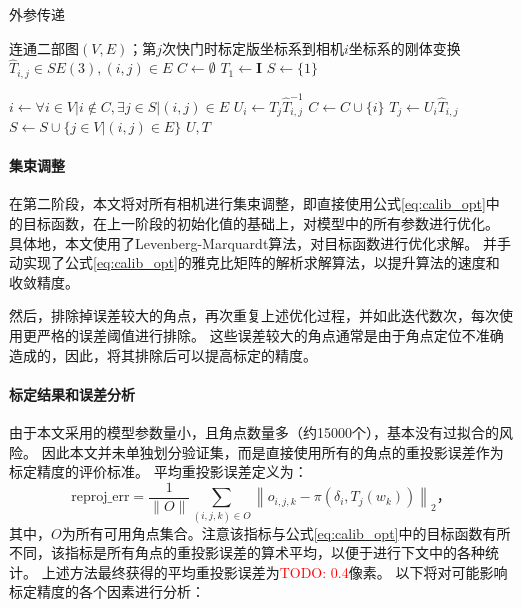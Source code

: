 \documentclass{scutmaster}
\newcommand{\TODO}[1]{\textcolor{red}{TODO: #1}}
\begin{document}
\begin{algorithm}[t]
    \caption{外参传递}
    \label{alg:calib_init}
    \begin{algorithmic}[1]
        \Require 连通二部图$(V,E)$；第$j$次快门时标定版坐标系到相机$i$坐标系的刚体变换$\hat{T}_{i,j}\in SE(3),(i,j)\in E$
            \State $C \gets \emptyset$
            \State $T_{1} \gets \mathbf{I}$
            \State $S \gets \{1\}$

                \State $i \gets \forall i\in V| i\notin C, \exists j\in S| (i,j)\in E$
                \State $U_{i} \gets T_{j}\hat{T}_{i,j}^{-1}$
                \State $C \gets C \cup \{i\}$
                    \State $T_{j} \gets U_{i}\hat{T}_{i,j}$
                \EndFor
                \State $S \gets S \cup \{j\in V| (i,j)\in E\}$
            \EndWhile
            \State \Return $U, T$
        \EndProcedure
    \end{algorithmic}
\end{algorithm}

\paragraph{集束调整}在第二阶段，本文将对所有相机进行集束调整，即直接使用公式\eqref{eq:calib_opt}中的目标函数，在上一阶段的初始化值的基础上，对模型中的所有参数进行优化。
具体地，本文使用了Levenberg-Marquardt算法\cite{lm}，对目标函数进行优化求解。
并手动实现了公式\eqref{eq:calib_opt}的雅克比矩阵的解析求解算法，以提升算法的速度和收敛精度。

然后，排除掉误差较大的角点，再次重复上述优化过程，并如此迭代数次，每次使用更严格的误差阈值进行排除。
这些误差较大的角点通常是由于角点定位不准确造成的，因此，将其排除后可以提高标定的精度。

\paragraph{标定结果和误差分析}

由于本文采用的模型参数量小，且角点数量多（约15000个），基本没有过拟合的风险。
因此本文并未单独划分验证集，而是直接使用所有的角点的重投影误差作为标定精度的评价标准。
平均重投影误差定义为：
\begin{equation}
    \label{eq:reproj_err}
    \text{reproj\_err} = \frac{1}{\|O\|}\sum_{(i,j,k)\in O}\left\|o_{i,j,k} - \pi\left(\delta_i, T_j(w_k)\right)\right\|_2
    \text{，}
\end{equation}
其中，$O$为所有可用角点集合。注意该指标与公式\eqref{eq:calib_opt}中的目标函数有所不同，该指标是所有角点的重投影误差的算术平均，以便于进行下文中的各种统计。
上述方法最终获得的平均重投影误差为\TODO{0.4}像素。
以下将对可能影响标定精度的各个因素进行分析：
\end{document}
